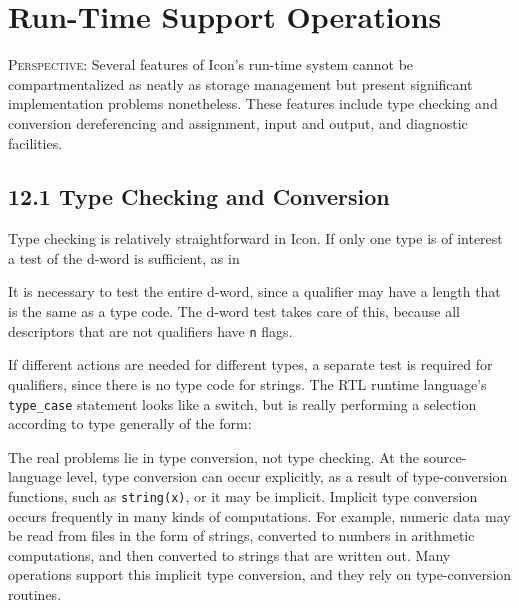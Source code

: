 \chapter{Run-Time Support Operations}

\textsc{Perspective}: Several features of Icon's run-time system
cannot be compartmentalized as neatly as storage management but
present significant implementation problems nonetheless. These
features include type checking and conversion dereferencing and
assignment, input and output, and diagnostic facilities.

\section[12.1 Type Checking and Conversion]{12.1 Type Checking and Conversion}

Type checking is relatively straightforward in Icon. If only one type
is of interest a test of the d-word is sufficient, as in

\goodbreak
{}

It is necessary to test the entire d-word, since a qualifier may have
a length that is the same as a type code. The d-word test takes care
of this, because all descriptors that are not qualifiers have \texttt{n} flags.

If different actions are needed for different types, a separate test
is required for qualifiers, since there is no type code for
strings. The RTL runtime language's \texttt{type\_case} statement
looks like a switch, but is really performing a selection according to
type generally of the form:

\goodbreak
{}

The real problems lie in type conversion, not type checking. At the
source-language level, type conversion can occur explicitly, as a
result of type-conversion functions, such as \texttt{string(x)}, or it
may be implicit. Implicit type conversion occurs frequently in many
kinds of computations. For example, numeric data may be read from
files in the form of strings, converted to numbers in arithmetic
computations, and then converted to strings that are written out.
Many operations support this implicit type conversion, and they rely
on type-conversion routines.

